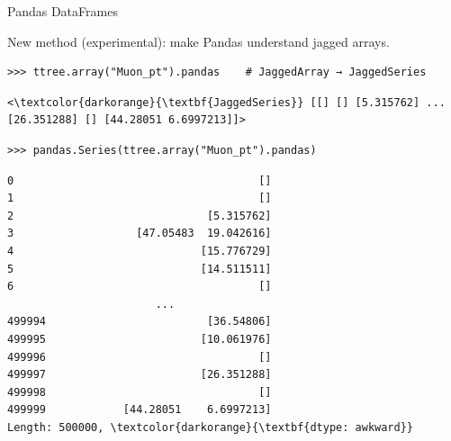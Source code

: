 \documentclass[aspectratio=169]{beamer}
\begin{document}
\begin{frame}[fragile]{Pandas DataFrames}
\large
\vspace{0.25 cm}

New method (experimental): make Pandas understand jagged arrays.

\small
\begin{verbatim}
>>> ttree.array("Muon_pt").pandas    # JaggedArray → JaggedSeries
\end{verbatim}
\scriptsize\color{darkblue}\vspace{-0.75\baselineskip}\begin{Verbatim}[commandchars=\\\{\}]
<\textcolor{darkorange}{\textbf{JaggedSeries}} [[] [] [5.315762] ... [26.351288] [] [44.28051 6.6997213]]>
\end{Verbatim}
\color{black}

\small
\begin{verbatim}
>>> pandas.Series(ttree.array("Muon_pt").pandas)
\end{verbatim}
\scriptsize\color{darkblue}\vspace{-0.75\baselineskip}\begin{Verbatim}[commandchars=\\\{\}]
0                                      []
1                                      []
2                              [5.315762]
3                   [47.05483  19.042616]
4                             [15.776729]
5                             [14.511511]
6                                      []
                       ...               
499994                         [36.54806]
499995                        [10.061976]
499996                                 []
499997                        [26.351288]
499998                                 []
499999            [44.28051    6.6997213]
Length: 500000, \textcolor{darkorange}{\textbf{dtype: awkward}}
\end{Verbatim}
\end{frame}
\end{document}
